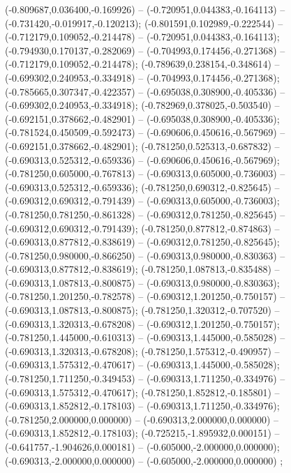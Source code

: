  (-0.809687,0.036400,-0.169926) -- (-0.720951,0.044383,-0.164113) -- (-0.731420,-0.019917,-0.120213);
 (-0.801591,0.102989,-0.222544) -- (-0.712179,0.109052,-0.214478) -- (-0.720951,0.044383,-0.164113);
 (-0.794930,0.170137,-0.282069) -- (-0.704993,0.174456,-0.271368) -- (-0.712179,0.109052,-0.214478);
 (-0.789639,0.238154,-0.348614) -- (-0.699302,0.240953,-0.334918) -- (-0.704993,0.174456,-0.271368);
 (-0.785665,0.307347,-0.422357) -- (-0.695038,0.308900,-0.405336) -- (-0.699302,0.240953,-0.334918);
 (-0.782969,0.378025,-0.503540) -- (-0.692151,0.378662,-0.482901) -- (-0.695038,0.308900,-0.405336);
 (-0.781524,0.450509,-0.592473) -- (-0.690606,0.450616,-0.567969) -- (-0.692151,0.378662,-0.482901);
 (-0.781250,0.525313,-0.687832) -- (-0.690313,0.525312,-0.659336) -- (-0.690606,0.450616,-0.567969);
 (-0.781250,0.605000,-0.767813) -- (-0.690313,0.605000,-0.736003) -- (-0.690313,0.525312,-0.659336);
 (-0.781250,0.690312,-0.825645) -- (-0.690312,0.690312,-0.791439) -- (-0.690313,0.605000,-0.736003);
 (-0.781250,0.781250,-0.861328) -- (-0.690312,0.781250,-0.825645) -- (-0.690312,0.690312,-0.791439);
 (-0.781250,0.877812,-0.874863) -- (-0.690313,0.877812,-0.838619) -- (-0.690312,0.781250,-0.825645);
 (-0.781250,0.980000,-0.866250) -- (-0.690313,0.980000,-0.830363) -- (-0.690313,0.877812,-0.838619);
 (-0.781250,1.087813,-0.835488) -- (-0.690313,1.087813,-0.800875) -- (-0.690313,0.980000,-0.830363);
 (-0.781250,1.201250,-0.782578) -- (-0.690312,1.201250,-0.750157) -- (-0.690313,1.087813,-0.800875);
 (-0.781250,1.320312,-0.707520) -- (-0.690313,1.320313,-0.678208) -- (-0.690312,1.201250,-0.750157);
 (-0.781250,1.445000,-0.610313) -- (-0.690313,1.445000,-0.585028) -- (-0.690313,1.320313,-0.678208);
 (-0.781250,1.575312,-0.490957) -- (-0.690313,1.575312,-0.470617) -- (-0.690313,1.445000,-0.585028);
 (-0.781250,1.711250,-0.349453) -- (-0.690313,1.711250,-0.334976) -- (-0.690313,1.575312,-0.470617);
 (-0.781250,1.852812,-0.185801) -- (-0.690313,1.852812,-0.178103) -- (-0.690313,1.711250,-0.334976);
 (-0.781250,2.000000,0.000000) -- (-0.690313,2.000000,0.000000) -- (-0.690313,1.852812,-0.178103);
 (-0.725215,-1.895932,0.000151) -- (-0.641757,-1.904626,0.000181) -- (-0.605000,-2.000000,0.000000);
 (-0.690313,-2.000000,0.000000) -- (-0.605000,-2.000000,0.000000) ;
